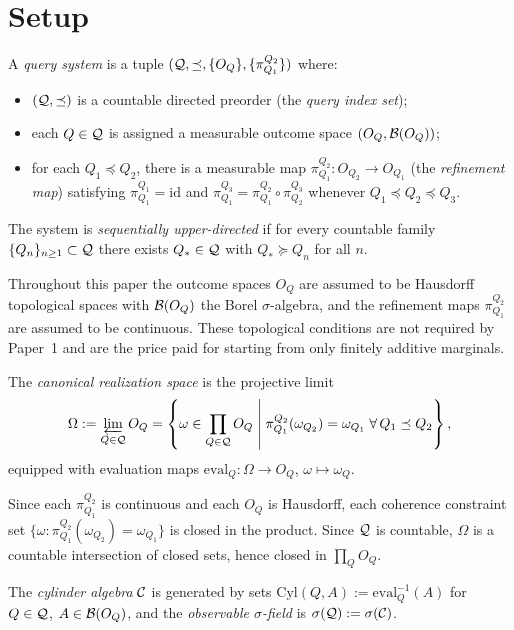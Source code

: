 \section{Setup}\label{sec:setup}

\begin{definition}
A \emph{query system} is a tuple $(\mathcal{Q}, \preceq, \{O_Q\},
\{\pi^{Q_2}_{Q_1}\})$ where:
\begin{itemize}
\item $(\mathcal{Q}, \preceq)$ is a countable directed preorder (the
  \emph{query index set});
\item each $Q \in \mathcal{Q}$ is assigned a measurable outcome space
  $(O_Q, \mathcal{B}(O_Q))$;
\item for each $Q_1 \preceq Q_2$, there is a measurable map
  $\pi^{Q_2}_{Q_1} : O_{Q_2} \to O_{Q_1}$ (the
  \emph{refinement map}) satisfying $\pi^{Q_1}_{Q_1} = \mathrm{id}$
  and $\pi^{Q_3}_{Q_1} = \pi^{Q_2}_{Q_1} \circ \pi^{Q_3}_{Q_2}$
  whenever $Q_1 \preceq Q_2 \preceq Q_3$.
\end{itemize}
The system is \emph{sequentially upper-directed} if for every
countable family $\{Q_n\}_{n \ge 1} \subset \mathcal{Q}$ there exists
$Q_* \in \mathcal{Q}$ with $Q_* \succeq Q_n$ for all $n$.
\end{definition}

\begin{remark}
Throughout this paper the outcome spaces $O_Q$ are assumed to be
Hausdorff topological spaces with $\mathcal{B}(O_Q)$ the Borel
$\sigma$-algebra, and the refinement maps $\pi^{Q_2}_{Q_1}$ are
assumed to be continuous.  These topological conditions are not
required by Paper~1 and are the price paid for starting from only
finitely additive marginals.
\end{remark}

\begin{definition}
The \emph{canonical realization space} is the projective limit
\[
\Omega
:=
\varprojlim_{Q \in \mathcal{Q}} O_Q
=
\left\{
\omega \in \prod_{Q \in \mathcal{Q}} O_Q
\;\middle|\;
\pi^{Q_2}_{Q_1}(\omega_{Q_2}) = \omega_{Q_1}
\;\forall\, Q_1 \preceq Q_2
\right\},
\]
equipped with evaluation maps $\mathrm{eval}_Q : \Omega \to O_Q$,
$\omega \mapsto \omega_Q$.

Since each $\pi^{Q_2}_{Q_1}$ is continuous and each $O_Q$ is
Hausdorff, each coherence constraint set
$\{\omega : \pi^{Q_2}_{Q_1}(\omega_{Q_2}) = \omega_{Q_1}\}$ is
closed in the product.  Since $\mathcal{Q}$ is countable, $\Omega$ is a
countable intersection of closed sets, hence closed in
$\prod_Q O_Q$.

The \emph{cylinder algebra} $\mathcal{C}$ is generated by sets
$\mathrm{Cyl}(Q, A) := \mathrm{eval}_Q^{-1}(A)$ for $Q \in \mathcal{Q}$,
$A \in \mathcal{B}(O_Q)$, and the \emph{observable $\sigma$-field} is
$\sigma(\mathcal{Q}) := \sigma(\mathcal{C})$.
\end{definition}

